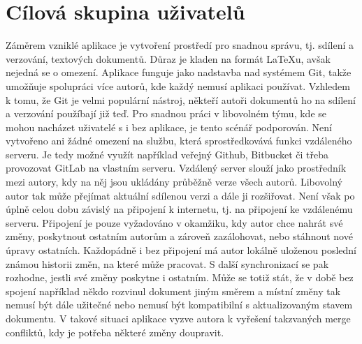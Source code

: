 \chapter{Cílová skupina uživatelů}
Záměrem vzniklé aplikace je vytvoření prostředí pro snadnou správu, tj. sdílení a verzování, textových dokumentů.
Důraz je kladen na formát LaTeXu, avšak nejedná se o omezení. Aplikace funguje jako nadstavba nad systémem Git, takže umožňuje spolupráci více autorů, kde každý nemusí aplikaci používat. Vzhledem k tomu, že Git je velmi populární nástroj,
někteří autoři dokumentů ho na sdílení a verzování použíbají již teď. Pro snadnou práci v libovolném týmu, kde se mohou nacházet uživatelé s i bez aplikace, je tento scénář podporován. Není vytvořeno ani žádné omezení na službu, která sprostředkovává funkci vzdáleného serveru.
Je tedy možné využít například veřejný Github, Bitbucket či třeba provozovat GitLab na vlastním serveru. Vzdálený server slouží jako prostředník mezi autory, kdy na něj jsou ukládány průběžně verze všech autorů. Libovolný autor tak může přejímat aktuální sdílenou verzi a dále ji rozšiřovat. Není však po úplně celou dobu závislý na připojení k internetu, tj. na připojení ke vzdálenému serveru. Připojení je pouze vyžadováno v okamžiku, kdy autor chce nahrát své změny, poskytnout ostatním autorům a zároveň zazálohovat, nebo stáhnout nové úpravy ostatních.
Každopádně i bez připojení má autor lokálně uloženou poslední známou historii změn, na které může pracovat. S další synchronizací se pak rozhodne, jestli své změny poskytne i ostatním. Může se totiž stát, že v době bez spojení například někdo rozvinul dokument jiným směrem a místní změny tak nemusí být dále užitečné nebo nemusí být kompatibilní s aktualizovaným stavem dokumentu. V takové situaci aplikace vyzve autora k vyřešení takzvaných merge confliktů, kdy je potřeba některé změny doupravit.
